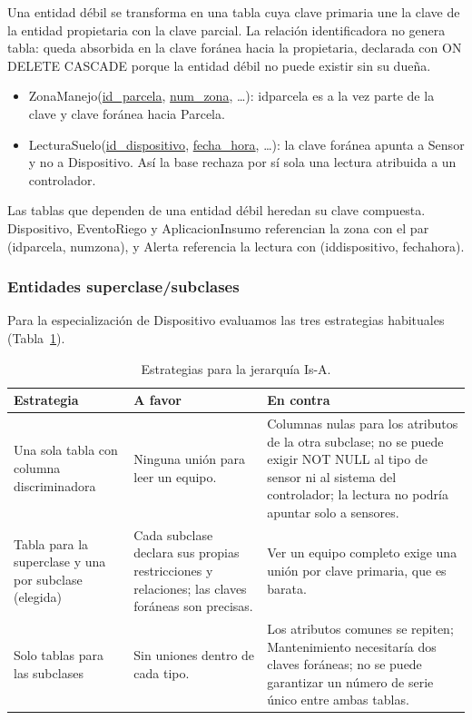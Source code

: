 \documentclass[11pt,letterpaper]{article}
\newcommand{\tbus}{\textunderscore\allowbreak}
\newcommand{\tb}[1]{{\ttfamily\let\_\tbus #1}}
\newcommand{\pk}[1]{\underline{#1}}
\begin{document}
Una entidad débil se transforma en una tabla cuya clave primaria une la clave de la entidad propietaria con la clave parcial. La relación identificadora no genera tabla: queda absorbida en la clave foránea hacia la propietaria, declarada con \tb{ON DELETE CASCADE} porque la entidad débil no puede existir sin su dueña.

\begin{itemize}[leftmargin=1.4em,itemsep=0.1em]
\item \tb{Zona\_Manejo}(\pk{id\_parcela}, \pk{num\_zona}, \ldots): \tb{id\_parcela} es a la vez parte de la clave y clave foránea hacia \tb{Parcela}.
\item \tb{Lectura\_Suelo}(\pk{id\_dispositivo}, \pk{fecha\_hora}, \ldots): la clave foránea apunta a \tb{Sensor} y no a \tb{Dispositivo}. Así la base rechaza por sí sola una lectura atribuida a un controlador.
\end{itemize}

Las tablas que dependen de una entidad débil heredan su clave compuesta. \tb{Dispositivo}, \tb{Evento\_Riego} y \tb{Aplicacion\_Insumo} referencian la zona con el par (\tb{id\_parcela}, \tb{num\_zona}), y \tb{Alerta} referencia la lectura con (\tb{id\_dispositivo}, \tb{fecha\_hora}).

\subsubsection{Entidades superclase/subclases}

Para la especialización de \tb{Dispositivo} evaluamos las tres estrategias habituales (Tabla~\ref{tab:isa}).

\begin{table}[H]
\centering\small
\begin{tabularx}{\textwidth}{>{\raggedright\arraybackslash}p{3.6cm}>{\raggedright\arraybackslash}X>{\raggedright\arraybackslash}X}
\toprule
\textbf{Estrategia} & \textbf{A favor} & \textbf{En contra} \\
\midrule
Una sola tabla con columna discriminadora & Ninguna unión para leer un equipo. & Columnas nulas para los atributos de la otra subclase; no se puede exigir \tb{NOT NULL} al tipo de sensor ni al sistema del controlador; la lectura no podría apuntar solo a sensores. \\
Tabla para la superclase y una por subclase (elegida) & Cada subclase declara sus propias restricciones y relaciones; las claves foráneas son precisas. & Ver un equipo completo exige una unión por clave primaria, que es barata. \\
Solo tablas para las subclases & Sin uniones dentro de cada tipo. & Los atributos comunes se repiten; \tb{Mantenimiento} necesitaría dos claves foráneas; no se puede garantizar un número de serie único entre ambas tablas. \\
\bottomrule
\end{tabularx}
\caption{Estrategias para la jerarquía Is-A.}
\label{tab:isa}
\end{table}
\end{document}

